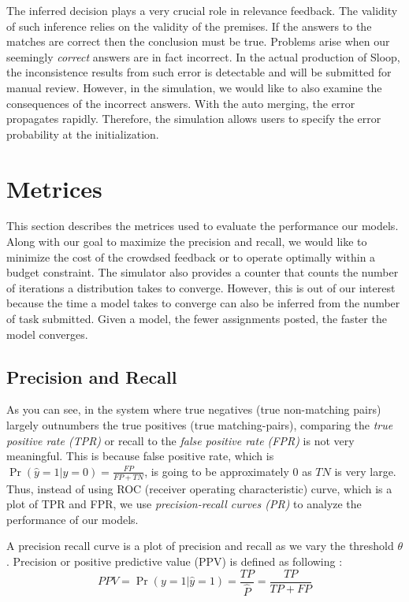 The inferred decision plays a very crucial role in relevance feedback. The validity of such inference relies on the validity of the premises. If the answers to the matches are correct then the conclusion must be true. Problems arise when our seemingly \emph{correct} answers are in fact incorrect. In the actual production of Sloop, the inconsistence results from such error is detectable and will be submitted for manual review. However, in the simulation, we would like to also examine the consequences of the incorrect answers. With the auto merging, the error propagates rapidly. Therefore, the simulation allows users to specify the error probability at the initialization.

\section{Metrices} %
\label{sec:metrices}

This section describes the metrices used to evaluate the performance our models. Along with our goal to maximize the precision and recall, we would like to minimize the cost of the crowdsed feedback or to operate optimally within a budget constraint. The simulator also provides a counter that counts the number of iterations a distribution takes to converge. However, this is out of our interest because the time a model takes to converge can also be inferred from the number of task submitted. Given a model, the fewer assignments posted, the faster the model converges. 

\subsection{Precision and Recall} %
\label{sub:precision_and_recall}
As you can see, in the system where true negatives (true non-matching pairs) largely outnumbers the true positives (true matching-pairs), comparing the \emph{true positive rate (TPR)} or recall to the \emph{false positive rate (FPR)} is not very meaningful. This is because false positive rate, which is $\Pr{(\hat{y}=1|y=0)} = \frac{FP}{FP+TN}$, is going to be approximately 0 as $TN$ is very large. Thus, instead of using ROC (receiver operating characteristic) curve, which is a plot of TPR and FPR, we use \emph{precision-recall curves (PR)} to analyze the performance of our models.

A precision recall curve is a plot of precision and recall as we  vary the threshold $\theta$. Precision or positive predictive value (PPV) is defined as following \cite{manning2008introduction}:
$$PPV = \Pr{(y=1|\hat{y}=1)} = \frac{TP}{\hat{P}} = \frac{TP}{TP+FP}$$

